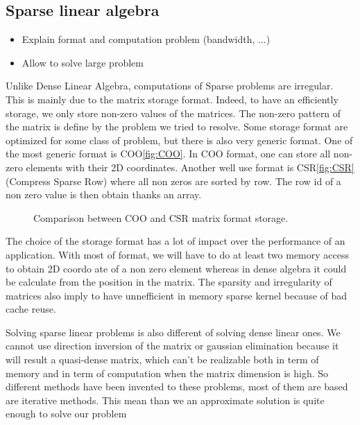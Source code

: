 \subsection{Sparse linear algebra}

  \begin{itemize}
    \item Explain format and computation problem (bandwidth, ...)
    \item Allow to solve large problem
  \end{itemize}


Unlike Dense Linear Algebra, computations of Sparse problems are irregular.
%
This is mainly due to the matrix storage format.
%
Indeed, to have an efficiently storage, we only store non-zero values of the matrices.
%
The non-zero pattern of the matrix is define by the problem we tried to resolve.
%
Some storage format are optimized for some class of problem, but there is also very generic format.
%
One of the most generic format is COO\ref{fig:COO}.
%
In COO format, one can store all non-zero elements with their 2D coordinates.
%
Another well use format is CSR\ref{fig:CSR} (Compress Sparse Row) where all non zeros are sorted by row.
%
The row id of a non zero value is then obtain thanks an array.

\begin{figure}[!ht]
     \begin{center}
    \end{center}
    \caption{Comparison between COO and CSR matrix format storage.}
    \label{fig:matrix_storage}
\end{figure}

The choice of the storage format has a lot of impact over the performance of an application.
%
With most of format, we will have to do at least two memory access to obtain 2D coordo ate of a non zero element whereas in dense algebra it could be calculate from the position in the matrix.
%
The sparsity and irregularity of matrices also imply to have unnefficient in memory sparse kernel because of bad cache reuse.


Solving sparse linear problems is also different of solving dense linear ones.
%
We cannot use direction inversion of the matrix or gaussian elimination because it will result a quasi-dense matrix, which can't be realizable both in term of memory and in term of computation when the matrix dimension is high.
%
So different methods have been invented to these problems, most of them are based are iterative methods.
%
This mean than we an approximate solution is quite enough to solve our problem
